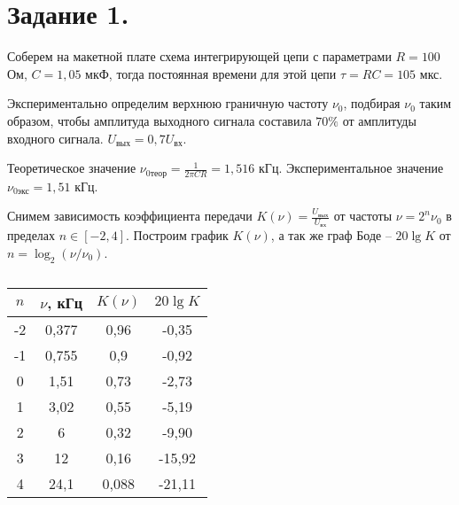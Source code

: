 


	
	
	\section*{Задание 1.}
	
	Соберем на макетной плате схема интегрирующей цепи с параметрами $R = 100$ Ом, $C = 1,05$ мкФ, тогда постоянная времени для этой цепи $\tau = R C = 105$ мкс.
	
	Экспериментально определим верхнюю граничную частоту $\nu_0$, подбирая $\nu_0$ таким образом, чтобы амплитуда выходного сигнала составила $70 \%$ от амплитуды входного сигнала. $U_{\text{вых}} = 0,7 U_{\text{вх}}$.
	
	Теоретическое значение $\nu_{\text{0теор}} = \frac{1}{2 \pi C R} = 1,516$ кГц. Экспериментальное значение $\nu_{\text{0экс}} = 1,51$ кГц.
	
	
	Снимем зависимость коэффициента передачи $K(\nu) = \frac{U_{\text{вых}}}{U_{\text{вх}}}$ от частоты $\nu = 2^n \nu_0$ в пределах $n \in [-2, 4]$. Построим график $K(\nu)$, а так же граф Боде -- $20 \lg K$ от$n = \log_2 (\nu / \nu_0)$.

	\begin{table}[h!]
		\begin{center}
			\begin{tabular}{|c|c|c|c|}
				\hline
				$n$& $\nu$, кГц & $K(\nu)$ &  $20 \lg K$      \\ \hline
				-2 & 0,377      & 0,96     & -0,35  \\ \hline
				-1 & 0,755      & 0,9      & -0,92  \\ \hline
				0  & 1,51       & 0,73     & -2,73  \\ \hline
				1  & 3,02       & 0,55     & -5,19  \\ \hline
				2  & 6          & 0,32     & -9,90  \\ \hline
				3  & 12         & 0,16     & -15,92 \\ \hline
				4  & 24,1       & 0,088    & -21,11 \\ \hline
			\end{tabular}
		\end{center}
		\caption{}
	\end{table}

